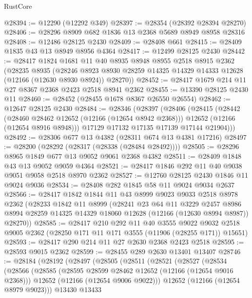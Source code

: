 \begin{lexlean}{RustCore}
\begin{coremodule}
@28394 := @12290 (@12292 @349)
@28397 := @28354 (@28392 @28394 @28270)
@28406 := @28296 @8909 @682 @1836 @13 @2368 @5689 @8949 @8958 @28316
@28408 := @12486 @28125 @2430
@28409 := @28408 @661
@28415 := @28409 @1835 @43 @13 @8949 @8956 @4364
@28417 := @12499 @28125 @2430
@28442 := @28417
    @1824
    @1681
    @11
    @40
    @8935
    @8948
    @8955
    @2518
    @8915
    @2362
    (@28235
      @8935
      (@28246 @8923 @8930 @28259 @14325 @14329 @14333 @12628 (@12166 (@12630 @8930 @8924)) @28270))
@28452 := @28417 @1679 @214 @11 @27 @8367 @2368 @2423 @2518 @8941 @2362
@28455 := @13390 @28125 @2430 @11
@28460 := @28452 (@28455 @1678 @8367 @26550 @26554)
@28462 := @12647 @28125 @2430
@28484 := @28346
    (@28397
      (@28406
        (@28415
          (@28442
            (@28460 @28462 @12652 (@12166 (@12654 @8942 @2368)))
            @12652
            (@12166 (@12654 @8916 @8948)))
          @17129
          @17132
          @17135
          @17139
          @17144
          @21904)))
@28492 := @28306 @677 @13 @4382 (@28311 @674 @13 @4381 @17216)
@28497 := @28200 (@28292 (@28317 (@28338 (@28484 @28492))))
@28505 := @28296 @8965 @1849 @677 @13 @9052 @9061 @2368 @4382
@28511 := @28409 @1848 @43 @13 @9052 @9059 @4364
@28521 := @28417 @1846 @292 @11 @40 @9038 @9051 @9058 @2518 @8970 @2362
@28527 := @12760 @28125 @2430 @1846 @11 @9024 @9036
@28534 := @28408 @282 @1845 @58 @11 @9024 @9034 @2637
@28566 := @28417
    @1842
    @1844
    @11
    @43
    @8999
    @9023
    @9033
    @2518
    @8978
    @2362
    (@28233
      @1842
      @11
      @8999
      (@28241
        @23
        @64
        @11
        @3229
        @2457
        @8986
        @8994
        @28259
        @14325
        @14329
        @18060
        @12628
        (@12166 (@12630 @8994 @8987))
        @28270))
@28585 := @28417
    @210
    @292
    @11
    @40
    @3555
    @9022
    @9032
    @2518
    @9005
    @2362
    (@28250 @171 @11 @171 @3555 (@11906 (@28255 @171)) @15651)
@28593 := @28417 @290 @214 @11 @27 @2630 @2368 @2423 @2518
@28595 := @28593 @9015 @2362
@28599 := @28455 @289 @2630 @13401 @13407
@28746 := @28184
    (@28192
      (@28497
        (@28505
          (@28511
            (@28521
              (@28527
                (@28534
                  (@28566
                    (@28585
                      (@28595 @28599 @28462 @12652 (@12166 (@12654 @9016 @2368)))
                      @12652
                      (@12166 (@12654 @9006 @9022)))
                    @12652
                    (@12166 (@12654 @8979 @9023)))
                  @13430
                  @13433

\end{coremodule}
\end{lexlean}
